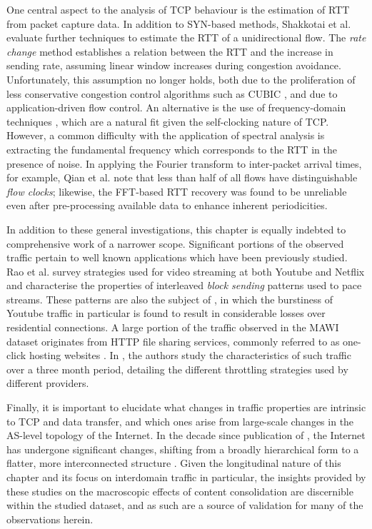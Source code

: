 One central aspect to the analysis of \ac{TCP} behaviour is the estimation of \ac{RTT} from packet capture data. 
In addition to SYN-based methods, Shakkotai et al. \cite{Shakkottai:2004p408} evaluate further techniques to estimate the \ac{RTT} of a unidirectional flow. 
The \textit{rate change} method establishes a relation between the \ac{RTT} and the increase in sending rate, assuming linear window increases during congestion avoidance. 
Unfortunately, this assumption no longer holds, both due to the proliferation of less conservative congestion control algorithms such as CUBIC \cite{Ha:2008p471}, and due to application-driven flow control. 
An alternative is the use of frequency-domain techniques \cite{Veal:2005p412,Lance:2005p565,Qian:2009p429}, which are a natural fit given the self-clocking nature of \ac{TCP}. 
However, a common difficulty with the application of spectral analysis is extracting the fundamental frequency which corresponds to the \ac{RTT} in the presence of noise. 
In applying the Fourier transform to inter-packet arrival times, for example, Qian et al. \cite{Qian:2009p429} note that less than half of all flows have distinguishable \textit{flow clocks}; likewise, the \ac{FFT}-based \ac{RTT} recovery was found to be unreliable even after pre-processing available data to enhance inherent periodicities.

In addition to these general investigations, this chapter is equally indebted to comprehensive work of a narrower scope.
Significant portions of the observed traffic pertain to well known applications which have been previously studied.
Rao et al. \cite{Rao:2011p547} survey strategies used for video streaming at both Youtube and Netflix and characterise the properties of interleaved \emph{block sending} patterns used to pace streams.
These patterns are also the subject of \cite{Alcock:2011p575}, in which the burstiness of Youtube traffic in particular is found to result in considerable losses over residential connections.
A large portion of the traffic observed in the \acs{MAWI} dataset originates from \ac{HTTP} file sharing services, commonly referred to as one-click hosting websites \cite{oneclick1}.
In \cite{SanjuasCuxart:2012p588}, the authors study the characteristics of such traffic over a three month period, detailing the different throttling strategies used by different providers.

Finally, it is important to elucidate what changes in traffic properties are intrinsic to \ac{TCP} and data transfer, and which ones arise from large-scale changes in the \ac{AS}-level topology of the Internet. 
In the decade since publication of \cite{Zhang:2002p85}, the Internet has undergone significant changes, shifting from a broadly hierarchical form to a flatter, more interconnected structure \cite{Labovitz:2010p175,Ager:2012p567}.
Given the longitudinal nature of this chapter and its focus on interdomain traffic in particular, the insights provided by these studies on the macroscopic effects of content consolidation are discernible within the studied dataset, and as such are a source of validation for many of the observations herein.
